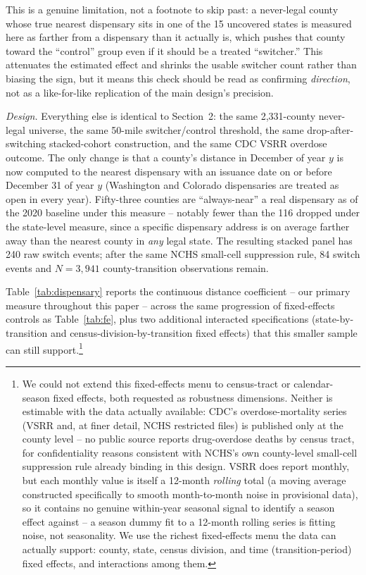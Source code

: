 \documentclass[12pt]{article}
\begin{document}
This is a genuine limitation, not a footnote to skip past: a
never-legal county whose true nearest dispensary sits in one of the 15
uncovered states is measured here as farther from a dispensary than it
actually is, which pushes that county toward the ``control'' group even
if it should be a treated ``switcher.'' This attenuates the estimated
effect and shrinks the usable switcher count rather than biasing the
sign, but it means this check should be read as confirming
\emph{direction}, not as a like-for-like replication of the main
design's precision.

\emph{Design.} Everything else is identical to Section~2: the same
2,331-county never-legal universe, the same 50-mile switcher/control
threshold, the same drop-after-switching stacked-cohort construction,
and the same CDC VSRR overdose outcome. The only change is that a
county's distance in December of year $y$ is now computed to the
nearest dispensary with an issuance date on or before December 31 of
year $y$ (Washington and Colorado dispensaries are treated as
open in every year). Fifty-three counties are ``always-near'' a real
dispensary as of the 2020 baseline under this measure -- notably fewer
than the 116 dropped under the state-level measure, since a specific
dispensary address is on average farther away than the nearest county
in \emph{any} legal state. The resulting stacked panel has 240 raw
switch events; after the same NCHS small-cell suppression rule, 84
switch events and $N=3{,}941$ county-transition observations remain.

Table~\ref{tab:dispensary} reports the continuous distance coefficient
-- our primary measure throughout this paper -- across the same
progression of fixed-effects controls as Table~\ref{tab:fe}, plus two
additional interacted specifications (state-by-transition and
census-division-by-transition fixed effects) that this smaller sample
can still support.\footnote{We could not extend this fixed-effects
menu to census-tract or calendar-season fixed effects, both requested
as robustness dimensions. Neither is estimable with the data actually
available: CDC's overdose-mortality series (VSRR and, at finer detail,
NCHS restricted files) is published only at the county level -- no
public source reports drug-overdose deaths by census tract, for
confidentiality reasons consistent with NCHS's own county-level
small-cell suppression rule already binding in this design. VSRR does
report monthly, but each monthly value is itself a 12-month
\emph{rolling} total (a moving average constructed specifically to
smooth month-to-month noise in provisional data), so it contains no
genuine within-year seasonal signal to identify a season effect
against -- a season dummy fit to a 12-month rolling series is fitting
noise, not seasonality. We use the richest fixed-effects menu the data
can actually support: county, state, census division, and
time (transition-period) fixed effects, and interactions among them.}
\end{document}
